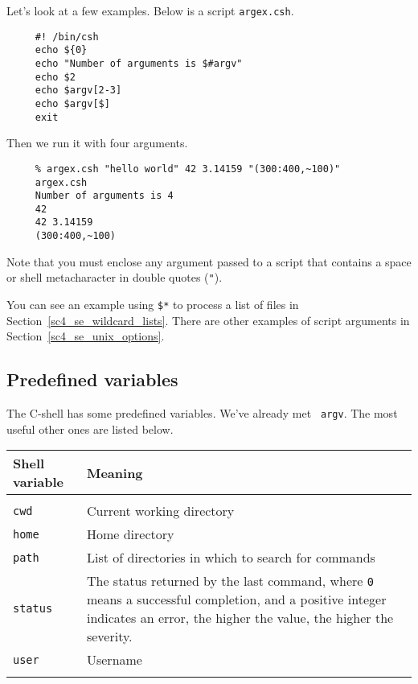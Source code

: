 \documentclass[twoside,11pt]{article}
\newcommand{\htmlref}[2]{#1}
\newcommand{\xlabel}[1]{}
\newcommand{\latexelsehtml}[2]{#1}
\newcommand{\latexelsehtml}[2]{#2}
\begin{document}
Let's look at a few examples.  Below is a script {\tt argex.csh}.
\small
\begin{verbatim}
     #! /bin/csh
     echo ${0}
     echo "Number of arguments is $#argv"
     echo $2
     echo $argv[2-3]
     echo $argv[$]
     exit
\end{verbatim}
\normalsize
Then we run it with four arguments.

\small
\begin{verbatim}
     % argex.csh "hello world" 42 3.14159 "(300:400,~100)"
     argex.csh
     Number of arguments is 4
     42
     42 3.14159
     (300:400,~100)
\end{verbatim}
\normalsize
Note that you must enclose any argument passed to a script that contains
a space or shell \htmlref{{\sf metacharacter}}{sc4_gl_met} in double quotes ({\tt{"}}).

You can see an example using {\tt \$*} to process a list of files 
\latexelsehtml{in Section~\ref{sc4_se_wildcard_lists}.
}{\htmlref{here}{sc4_se_wildcard_lists}.}  There are other examples of script
arguments in \latexelsehtml{Section~\ref{sc4_se_unix_options}.
}{\htmlref{UNIX options}{sc4_se_unix_options}.}

\subsection{\xlabel{sc4_se_predefined}Predefined variables
\label{sc4_se_predefined}}

The C-shell has some predefined variables.  We've already met {\tt
argv}.  The most useful other ones are listed below.

\begin{center}
\begin{tabular}{lp{100mm}}
Shell variable & Meaning \\ \hline
\\
{\tt cwd}      & Current working directory \\
{\tt home}     & Home directory \\
{\tt path}     & List of directories in which to search for commands \\
{\tt status}   & The status returned by the last command, where {\tt 0}
                 means a successful completion, and a positive integer
                 indicates an error, the higher the value, the higher
                 the severity. \\
{\tt user}     & Username \\
\\ \hline
\end{tabular}
\end{center}
\end{document}
